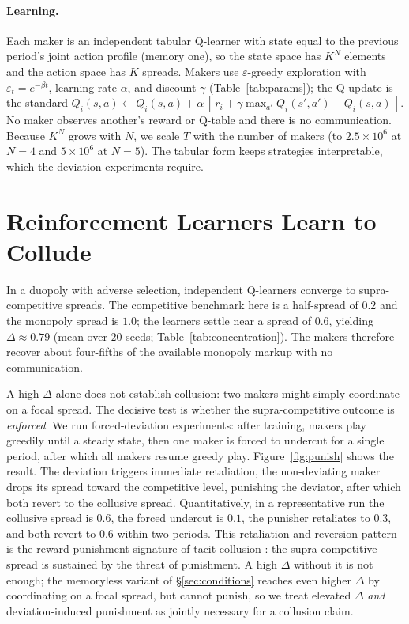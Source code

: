 \documentclass[sigconf]{acmart}
\begin{document}
\paragraph{Learning.} Each maker is an independent tabular Q-learner with state equal to the previous period's joint action profile (memory one), so the state space has $K^N$ elements and the action space has $K$ spreads. Makers use $\varepsilon$-greedy exploration with $\varepsilon_t = e^{-\beta t}$, learning rate $\alpha$, and discount $\gamma$ (Table~\ref{tab:params}); the Q-update is the standard $Q_i(s,a) \leftarrow Q_i(s,a) + \alpha\,[\,r_i + \gamma \max_{a'} Q_i(s',a') - Q_i(s,a)\,]$. No maker observes another's reward or Q-table and there is no communication. Because $K^N$ grows with $N$, we scale $T$ with the number of makers (to $2.5\times10^6$ at $N{=}4$ and $5\times10^6$ at $N{=}5$). The tabular form keeps strategies interpretable, which the deviation experiments require.

\section{Reinforcement Learners Learn to Collude}
\label{sec:collude}

In a duopoly with adverse selection, independent Q-learners converge to supra-competitive spreads. The competitive benchmark here is a half-spread of $0.2$ and the monopoly spread is $1.0$; the learners settle near a spread of $0.6$, yielding $\Delta \approx 0.79$ (mean over $20$ seeds; Table~\ref{tab:concentration}). The makers therefore recover about four-fifths of the available monopoly markup with no communication.

A high $\Delta$ alone does not establish collusion: two makers might simply coordinate on a focal spread. The decisive test is whether the supra-competitive outcome is \emph{enforced}. We run forced-deviation experiments: after training, makers play greedily until a steady state, then one maker is forced to undercut for a single period, after which all makers resume greedy play. Figure~\ref{fig:punish} shows the result. The deviation triggers immediate retaliation, the non-deviating maker drops its spread toward the competitive level, punishing the deviator, after which both revert to the collusive spread. Quantitatively, in a representative run the collusive spread is $0.6$, the forced undercut is $0.1$, the punisher retaliates to $0.3$, and both revert to $0.6$ within two periods. This retaliation-and-reversion pattern is the reward-punishment signature of tacit collusion \cite{calvano2020}: the supra-competitive spread is sustained by the threat of punishment. A high $\Delta$ without it is not enough; the memoryless variant of \S\ref{sec:conditions} reaches even higher $\Delta$ by coordinating on a focal spread, but cannot punish, so we treat elevated $\Delta$ \emph{and} deviation-induced punishment as jointly necessary for a collusion claim.
\end{document}
